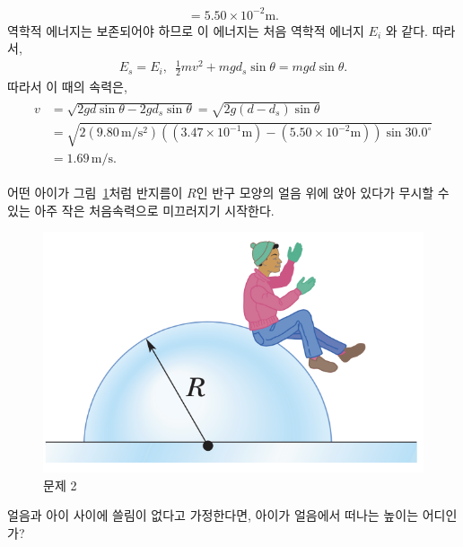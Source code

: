 \documentclass[floatfix,nofootinbib,superscriptaddress,fleqn]{revtex4-2}
\begin{document}
\begin{itemize}
\begin{align}
    =5.50\times 10^{-2}\mathrm{m}.
  \end{align}
  역학적 에너지는 보존되어야 하므로 이 에너지는 처음 역학적 에너지 $E_i$ 와 같다. 따라서,
  \begin{align}
    E_s = E_i,\,\,\,\frac{1}{2}mv^2+mgd_s\sin{\theta} = mgd\sin{\theta}.
  \end{align}
  따라서 이 때의 속력은,
  \begin{align}
    \begin{split}
      v &= \sqrt{2gd\sin{\theta}-2gd_s\sin{\theta}}
      = \sqrt{2g(d-d_s)\sin{\theta}}  \\
      &= \sqrt{2(9.80\,\mathrm{m/s^2})
      \left((3.47\times 10^{-1}\mathrm{m})
      -(5.50\times 10^{-2}\mathrm{m})\right)
      \sin{30.0^\circ}} \\
      &= 1.69\,\mathrm{m/s}.
    \end{split}
  \end{align}
\end{itemize}

\vspace{1cm}

어떤 아이가 그림~\ref{fig:2}처럼
반지름이 $R$인 반구 모양의 얼음 위에 앉아 있다가 무시할 수 있는 아주
작은 처음속력으로 미끄러지기 시작한다. 

\begin{figure}[ht]
  \centering
\includegraphics[scale=0.5]{Qfig9-3-20210330.png}  
  \caption{문제 2}
  \label{fig:2}
\end{figure}

얼음과 아이 사이에 쓸림이 없다고 가정한다면, 아이가 얼음에서 떠나는
높이는 어디인가?
\end{document}
